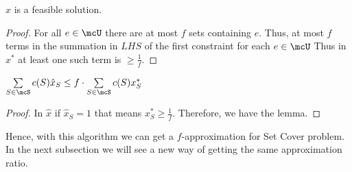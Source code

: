 \begin{algorithm}\DontPrintSemicolon
	\caption{$f$-Approximate Algorithm}
\end{algorithm}
\begin{lemma}{}{}
	$\hat{x}$ is a feasible solution.
\end{lemma}
\begin{proof}
	For all $e\in \mcU$ there are at most $f$ sets containing $e$. Thus, at most $f$ terms in the summation in $LHS$ of the first constraint for each $e\in \mcU$ Thus in $x^*$ at least one such term is $\geq \frac1f$.
\end{proof}
\begin{lemma}{}{}
	$\sum\limits_{S\in \mcS}c(S)\hat{x}_S\leq f\cdot \sum\limits_{S\in\mcS}c(S)x^*_S$
\end{lemma}
\begin{proof}
	In $\hat{x}$ if $\hat{x}_S=1$ that means $x^*_S\geq \frac1f$. Therefore, we have the lemma.
\end{proof}

Hence, with this algorithm we can get a $f$-approximation for Set Cover problem. In the next subsection we will see a new way of getting the same approximation ratio.

